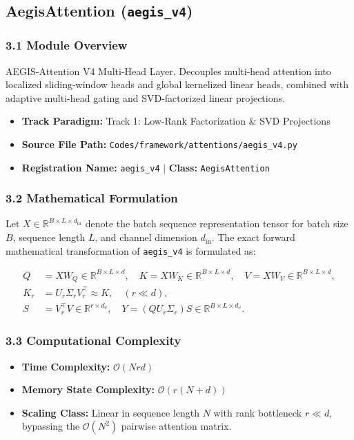 \subsection{AegisAttention (\texttt{aegis\_v4})}
\label{sec:app_module_aegis\_v4}

\subsubsection*{3.1 Module Overview}
AEGIS-Attention V4 Multi-Head Layer. Decouples multi-head attention into localized sliding-window heads and global kernelized linear heads, combined with adaptive multi-head gating and SVD-factorized linear projections.
\begin{itemize}
    \item \textbf{Track Paradigm:} Track 1: Low-Rank Factorization & SVD Projections
    \item \textbf{Source File Path:} \texttt{Codes/framework/attentions/aegis\_v4.py}
    \item \textbf{Registration Name:} \texttt{aegis\_v4} $\mid$ \textbf{Class:} \texttt{AegisAttention}
\end{itemize}

\subsubsection*{3.2 Mathematical Formulation}
Let $X \in \mathbb{R}^{B \times L \times d_{\text{in}}}$ denote the batch sequence representation tensor for batch size $B$, sequence length $L$, and channel dimension $d_{\text{in}}$. The exact forward mathematical transformation of \texttt{aegis\_v4} is formulated as:

\begin{align}
Q &= X W_Q \in \mathbb{R}^{B \times L \times d}, \quad K = X W_K \in \mathbb{R}^{B \times L \times d}, \quad V = X W_V \in \mathbb{R}^{B \times L \times d}, \\
K_r &= U_r \Sigma_r V_r^\top \approx K, \quad (r \ll d), \\
S &= V_r^\top V \in \mathbb{R}^{r \times d_v}, \quad Y = (Q U_r \Sigma_r) S \in \mathbb{R}^{B \times L \times d_v}.
\end{align}


\subsubsection*{3.3 Computational Complexity}
\begin{itemize}
    \item \textbf{Time Complexity:} $\mathcal{O}(N r d)$
    \item \textbf{Memory State Complexity:} $\mathcal{O}(r(N + d))$
    \item \textbf{Scaling Class:} Linear in sequence length $N$ with rank bottleneck $r \ll d$, bypassing the $\mathcal{O}(N^2)$ pairwise attention matrix.
\end{itemize}

